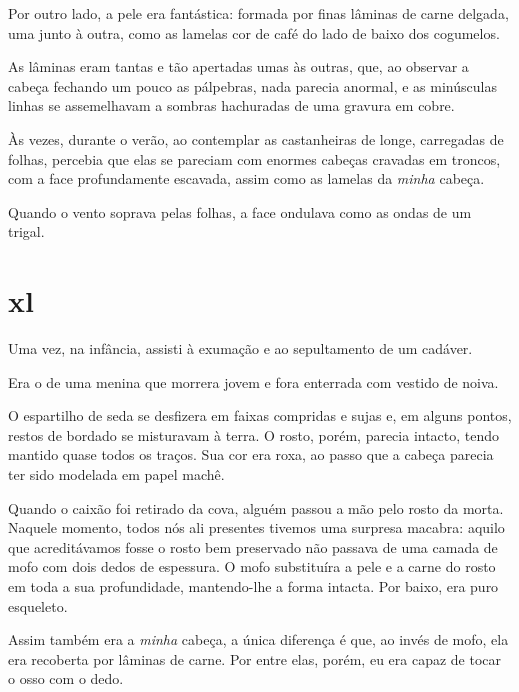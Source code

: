 Por outro lado, a pele era fantástica: formada por finas lâminas de carne
delgada, uma junto à outra, como as lamelas cor de café do lado de baixo dos
cogumelos.

As lâminas eram tantas e tão apertadas umas às outras, que, ao observar a
cabeça fechando um pouco as pálpebras, nada parecia anormal, e as minúsculas
linhas se assemelhavam a sombras hachuradas de uma gravura em cobre.

Às vezes, durante o verão, ao contemplar as castanheiras de longe, carregadas
de folhas, percebia que elas se pareciam com enormes cabeças cravadas em
troncos, com a face profundamente escavada, assim como as lamelas da \textit
{minha} cabeça.

Quando o vento soprava pelas folhas, a face ondulava como as ondas de um
trigal.



\section{xl} 


Uma vez, na infância, assisti à exumação e ao sepultamento de um cadáver.

Era o de uma menina que morrera jovem e fora enterrada com vestido de noiva. 

O espartilho de seda se desfizera em faixas compridas e sujas e, em alguns
pontos, restos de bordado se misturavam à terra. O rosto, porém, parecia
intacto, tendo mantido quase todos os traços. Sua cor era roxa, ao passo que
a cabeça parecia ter sido modelada em papel machê.

Quando o caixão foi retirado da cova, alguém passou a mão pelo rosto da morta.
Naquele momento, todos nós ali presentes tivemos uma surpresa macabra: aquilo
que acreditávamos fosse o rosto bem preservado não passava de uma camada de
mofo com dois dedos de espessura. O mofo substituíra a pele e a carne do
rosto em toda a sua profundidade, mantendo-lhe a forma intacta. Por baixo,
era puro esqueleto.

Assim também era a \textit{minha} cabeça, a única diferença é que, ao invés de
mofo, ela era recoberta por lâminas de carne. Por entre elas, porém, eu era
capaz de tocar o osso com o dedo.

